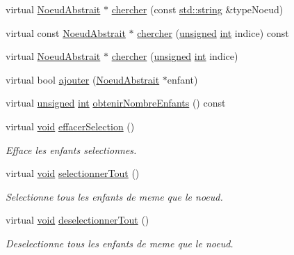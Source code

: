 \begin{DoxyCompactItemize}
\item 
virtual \hyperlink{class_noeud_abstrait}{Noeud\-Abstrait} $\ast$ \hyperlink{group__inf2990_ga622dcce31cdfb05afeedb7602e007f25}{chercher} (const \hyperlink{glew_8h_ae84541b4f3d8e1ea24ec0f466a8c568b}{std\-::string} \&type\-Noeud)
\item 
virtual const \hyperlink{class_noeud_abstrait}{Noeud\-Abstrait} $\ast$ \hyperlink{group__inf2990_gacf157b0fc2a929cc8e711dba2e201660}{chercher} (\hyperlink{_free_image_8h_a425076c7067a1b5166e2cc530e914814}{unsigned} \hyperlink{wglew_8h_a500a82aecba06f4550f6849b8099ca21}{int} indice) const 
\item 
virtual \hyperlink{class_noeud_abstrait}{Noeud\-Abstrait} $\ast$ \hyperlink{group__inf2990_ga67f24432c3a667154adf005f2c6c4396}{chercher} (\hyperlink{_free_image_8h_a425076c7067a1b5166e2cc530e914814}{unsigned} \hyperlink{wglew_8h_a500a82aecba06f4550f6849b8099ca21}{int} indice)
\item 
virtual bool \hyperlink{group__inf2990_gac2ce823d2c52140d4e1a924163ebbb58}{ajouter} (\hyperlink{class_noeud_abstrait}{Noeud\-Abstrait} $\ast$enfant)
\item 
virtual \hyperlink{_free_image_8h_a425076c7067a1b5166e2cc530e914814}{unsigned} \hyperlink{wglew_8h_a500a82aecba06f4550f6849b8099ca21}{int} \hyperlink{group__inf2990_ga87b0010b4dc77c69c6114a70f3de73bd}{obtenir\-Nombre\-Enfants} () const 
\item 
virtual \hyperlink{wglew_8h_aeea6e3dfae3acf232096f57d2d57f084}{void} \hyperlink{group__inf2990_ga64bcef79a467ea669275d885dbe31c8d}{effacer\-Selection} ()
\begin{DoxyCompactList}\small\item\em Efface les enfants selectionnes. \end{DoxyCompactList}\item 
virtual \hyperlink{wglew_8h_aeea6e3dfae3acf232096f57d2d57f084}{void} \hyperlink{group__inf2990_ga6c0620784aa50cb5c19664124e884cdd}{selectionner\-Tout} ()
\begin{DoxyCompactList}\small\item\em Selectionne tous les enfants de meme que le noeud. \end{DoxyCompactList}\item 
virtual \hyperlink{wglew_8h_aeea6e3dfae3acf232096f57d2d57f084}{void} \hyperlink{group__inf2990_ga0a838e8f0a086e71856e3a116508bcf2}{deselectionner\-Tout} ()
\begin{DoxyCompactList}\small\item\em Deselectionne tous les enfants de meme que le noeud. \end{DoxyCompactList}\item 

\end{DoxyCompactItemize}

